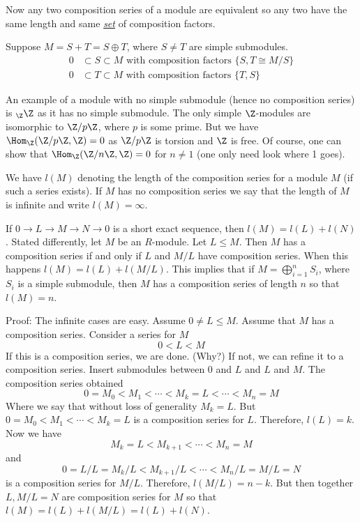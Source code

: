 Now any two composition series of a module are equivalent so any two have the same length and same \emph{\underline{set}} of composition factors. 

\begin{ex}
Suppose $M=S+T=S\oplus T$, where $S \neq T$ are simple submodules. 
\[
\begin{split}
0&\subset S \subset M \text{ with composition factors }\{S,T \cong M/S\}\\
0&\subset T \subset M \text{ with composition factors }\{T,S\} 
\end{split}
\]
\end{ex}

\begin{ex}
An example of a module with no simple submodule (hence no composition series) is $_\Z \Z$ as it has no simple submodule. The only simple $\Z$-modules are isomorphic to $\Z/p\Z$, where $p$ is some prime. But we have $\Hom_\Z(\Z/p\Z,\Z)=0$ as $\Z/p\Z$ is torsion and $\Z$ is free. Of course, one can show that $\Hom_\Z(\Z/n\Z,\Z)=0$ for $n \neq 1$ (one only need look where 1 goes). 
\end{ex}

\begin{dfn}[Length]
We have $l(M)$ denoting the length of the composition series for a module $M$ (if such a series exists). If $M$ has no composition series we say that the length of $M$ is infinite and write $l(M)=\infty$.
\end{dfn}

\begin{thm}
If $0 \longrightarrow L \longrightarrow M \longrightarrow N \longrightarrow 0$ is a short exact sequence, then $l(M)=l(L)+l(N)$. Stated differently, let $M$ be an $R$-module. Let $L \leq M$. Then $M$ has a composition series if and only if $L$ and $M/L$ have composition series. When this happens $l(M)=l(L)+l(M/L)$. This implies that if $M=\bigoplus_{i=1}^n S_i$, where $S_i$ is a simple submodule, then $M$ has a composition series of length $n$ so that $l(M)=n$.
\end{thm}

Proof: The infinite cases are easy. Assume $0 \neq L \leq M$. Assume that $M$ has a composition series. Consider a series for $M$
\[
0 < L < M
\]
If this is a composition series, we are done. (Why?) If not, we can refine it to a composition series. Insert submodules between 0 and $L$ and $L$ and $M$. The composition series obtained
\[
0=M_0 < M_1 < \cdots < M_k=L < \cdots< M_n=M
\]
Where we say that without loss of generality $M_k=L$. But $0=M_0 < M_1 < \cdots < M_k=L$ is a composition series for $L$. Therefore, $l(L)=k$. Now we have
\[
M_k=L <M_{k+1}< \cdots< M_n=M
\]
and
\[
0=L/L=M_k/L < M_{k+1}/L < \cdots< M_n/L=M/L=N
\]
is a composition series for $M/L$. Therefore, $l(M/L)=n-k$. But then together $L,M/L=N$ are composition series for $M$ so that $l(M)=l(L)+l(M/L)=l(L)+l(N)$. 

